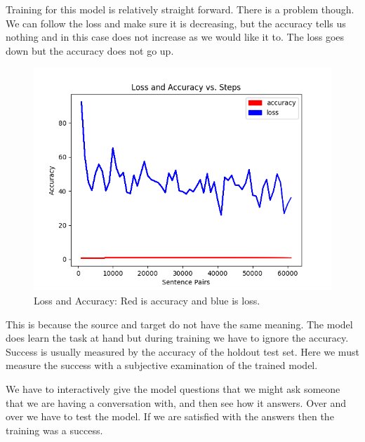 Training for this model is relatively straight forward. There is a problem though. We can follow the loss and make sure it is decreasing, but the accuracy tells us nothing and in this case does not increase as we would like it to. The loss goes down but the accuracy does not go up.

\begin{figure}[H]
	
	\includegraphics[scale=1.0]{Figure_1}
	
	\caption[Loss and Accuracy]{Loss and Accuracy: Red is accuracy and blue is loss.}
	
\end{figure}

This is because the source and target do not have the same meaning. The model does learn the task at hand but during training we have to ignore the accuracy. Success is usually measured by the accuracy of the holdout test set. Here we must measure the success with a subjective examination of the trained model.

We have to interactively give the model questions that we might ask someone that we are having a conversation with, and then see how it answers. Over and over we have to test the model. If we are satisfied with the answers then the training was a success.